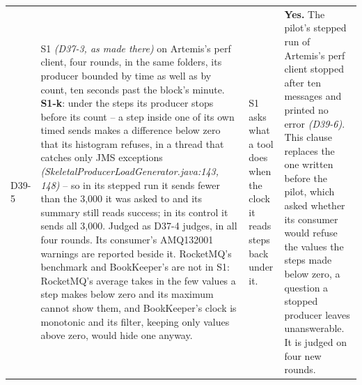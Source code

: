 \documentclass[11pt]{article}
\newcommand{\gl}[1]{{\color{soft}\itshape\small (#1)}}
\begin{document}
{\begin{longtable}{@{}p{1.1cm} >{\raggedright\arraybackslash}p{6.1cm} >{\raggedright\arraybackslash}p{6.0cm} >{\raggedright\arraybackslash}p{2.2cm}@{}}
D39-5 & S1 \gl{D37-3, as made there} on Artemis's perf client, four rounds, in the same folders, its producer bounded by time as well as by count, ten seconds past the block's minute. \textbf{S1-k}: under the steps its producer stops before its count -- a step inside one of its own timed sends makes a difference below zero that its histogram refuses, in a thread that catches only JMS exceptions \gl{SkeletalProducerLoadGenerator.java:143, 148} -- so in its stepped run it sends fewer than the 3,000 it was asked to and its summary still reads success; in its control it sends all 3,000. Judged as D37-4 judges, in all four rounds. Its consumer's AMQ132001 warnings are reported beside it. RocketMQ's benchmark and BookKeeper's are not in S1: RocketMQ's average takes in the few values a step makes below zero and its maximum cannot show them, and BookKeeper's clock is monotonic and its filter, keeping only values above zero, would hide one anyway. & S1 asks what a tool does when the clock it reads steps back under it. & \textbf{Yes.} The pilot's stepped run of Artemis's perf client stopped after ten messages and printed no error \gl{D39-6}. This clause replaces the one written before the pilot, which asked whether its consumer would refuse the values the steps made below zero, a question a stopped producer leaves unanswerable. It is judged on four new rounds. \\

\end{longtable}}
\end{document}
